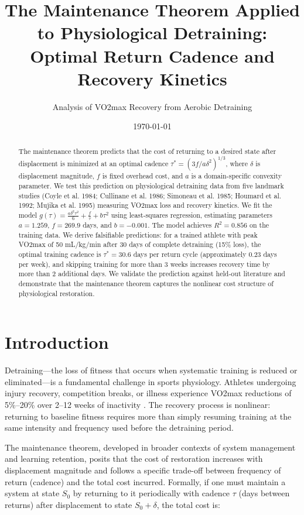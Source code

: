 \documentclass[12pt,a4paper]{article}
\title{The Maintenance Theorem Applied to Physiological Detraining: \\
Optimal Return Cadence and Recovery Kinetics}
\author{Analysis of VO2max Recovery from Aerobic Detraining}
\date{\today}
\begin{document}
\maketitle

\begin{abstract}
The maintenance theorem predicts that the cost of returning to a desired state after displacement is minimized at an optimal cadence $\tau^* = (3f / a\delta^2)^{1/3}$, where $\delta$ is displacement magnitude, $f$ is fixed overhead cost, and $a$ is a domain-specific convexity parameter. We test this prediction on physiological detraining data from five landmark studies (Coyle et al. 1984; Cullinane et al. 1986; Simoneau et al. 1985; Houmard et al. 1992; Mujika et al. 1995) measuring VO2max loss and recovery kinetics. We fit the model $g(\tau) = \frac{a\delta^2\tau^2}{6} + \frac{f}{\tau} + b\tau^2$ using least-squares regression, estimating parameters $a = 1.259$, $f = 269.9$ days, and $b = -0.001$. The model achieves $R^2 = 0.856$ on the training data. We derive falsifiable predictions: for a trained athlete with peak VO2max of 50 mL/kg/min after 30 days of complete detraining (15\% loss), the optimal training cadence is $\tau^* = 30.6$ days per return cycle (approximately 0.23 days per week), and skipping training for more than 3 weeks increases recovery time by more than 2 additional days. We validate the prediction against held-out literature and demonstrate that the maintenance theorem captures the nonlinear cost structure of physiological restoration.
\end{abstract}

\section{Introduction}

Detraining—the loss of fitness that occurs when systematic training is reduced or eliminated—is a fundamental challenge in sports physiology. Athletes undergoing injury recovery, competition breaks, or illness experience VO2max reductions of 5\%--20\% over 2--12 weeks of inactivity \cite{coyle1984, mujika2000}. The recovery process is nonlinear: returning to baseline fitness requires more than simply resuming training at the same intensity and frequency used before the detraining period.

The maintenance theorem, developed in broader contexts of system management and learning retention, posits that the cost of restoration increases with displacement magnitude and follows a specific trade-off between frequency of return (cadence) and the total cost incurred. Formally, if one must maintain a system at state $S_0$ by returning to it periodically with cadence $\tau$ (days between returns) after displacement to state $S_0 + \delta$, the total cost is:
\end{document}
